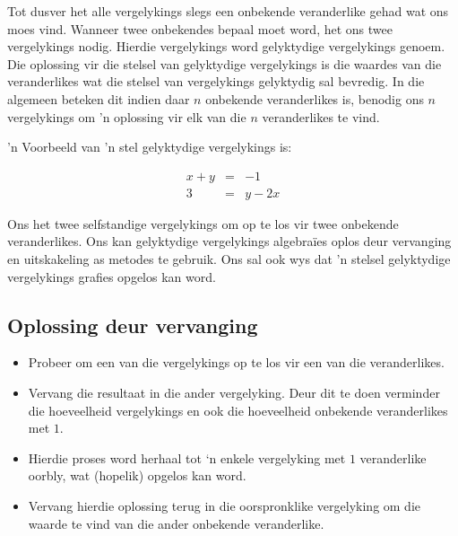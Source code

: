 Tot dusver het alle vergelykings slegs een onbekende veranderlike gehad wat ons moes vind.
Wanneer twee onbekendes bepaal moet word, het ons twee vergelykings nodig. Hierdie vergelykings word gelyktydige vergelykings
genoem. Die oplossing vir die stelsel van gelyktydige vergelykings is die waardes van die veranderlikes wat die stelsel van vergelykings gelyktydig sal bevredig. In die algemeen beteken dit indien daar $n$ onbekende veranderlikes is, benodig ons $n$ vergelykings om ’n oplossing vir elk van die $n$ veranderlikes te vind.\par 
’n Voorbeeld van 'n stel gelyktydige vergelykings is:

\begin{equation*}
\begin{array}{rcl} x+y&=&-1 \\ 
 3&=&y-2x 
\end{array}
\end{equation*}

Ons het twee selfstandige vergelykings om op te los vir twee onbekende veranderlikes. Ons kan gelyktydige vergelykings algebraïes oplos deur vervanging en uitskakeling as metodes te gebruik. Ons sal ook wys dat 'n stelsel gelyktydige vergelykings grafies opgelos kan word.\par

\par 
      


\subsection*{Oplossing deur vervanging}
\begin{itemize}
 \item Probeer om een van die vergelykings op te los vir een van die veranderlikes.
\item Vervang die resultaat in die ander vergelyking. Deur dit te doen verminder die hoeveelheid
vergelykings en ook die hoeveelheid onbekende veranderlikes met $1$.
\item Hierdie proses word herhaal tot ‘n enkele vergelyking met $1$ veranderlike oorbly, wat (hopelik) opgelos kan word.
\item Vervang hierdie oplossing terug in die oorspronklike vergelyking om die waarde te vind van die ander onbekende veranderlike.
\end{itemize}

